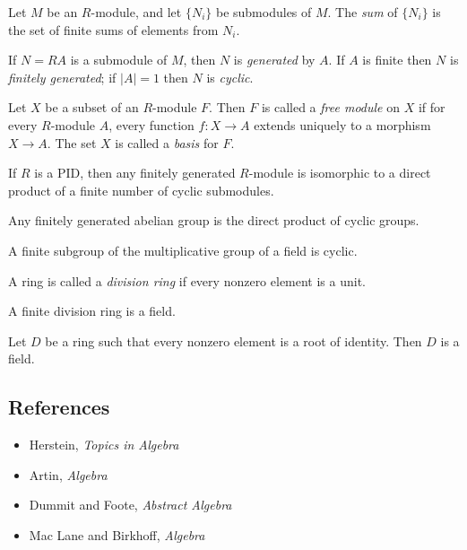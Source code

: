 \begin{defn}
    Let $M$ be an $R$-module, and let $\{N_i\}$ be submodules of $M$. The
    \emph{sum} of $\{N_i\}$ is the set of finite sums of elements from $N_i$.
\end{defn}
\begin{defn}
    If $N=RA$ is a submodule of $M$, then $N$ is \emph{generated} by $A$. If $A$
    is finite then $N$ is \emph{finitely generated}; if $|A|=1$ then $N$ is
    \emph{cyclic}.
\end{defn}
\begin{defn}
    Let $X$ be a subset of an $R$-module $F$.
    Then $F$ is called a \emph{free module} on $X$ if for every
    $R$-module $A$, every function $f:X\to A$ extends uniquely to a morphism
    $X\to A$. The set $X$ is called a \emph{basis} for $F$.
\end{defn}
\begin{thm}
    If $R$ is a PID, then any finitely generated $R$-module is isomorphic to a
    direct product of a finite number of cyclic submodules.
\end{thm}
\begin{cor}
    Any finitely generated abelian group is the direct product of cyclic groups.
\end{cor}
\begin{prop}
    A finite subgroup of the multiplicative group of a field is cyclic.
\end{prop}
\begin{defn}
    A ring is called a \emph{division ring} if every nonzero element
    is a unit.
\end{defn}
\begin{thm}[Wedderburn]
    A finite division ring is a field.
\end{thm}
\begin{thm}[Jacobson]
    Let $D$ be a ring such that every nonzero element is a root of
    identity. Then $D$ is a field.
\end{thm}
\subsection*{References}
\begin{itemize}
    \item Herstein, \emph{Topics in Algebra}
    \item Artin, \emph{Algebra}
    \item Dummit and Foote, \emph{Abstract Algebra}
    \item Mac Lane and Birkhoff, \emph{Algebra}
\end{itemize}

